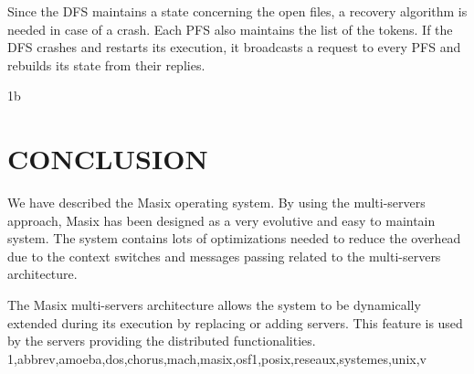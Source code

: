 	Since the DFS maintains a state concerning the open files, a recovery
algorithm is needed in case of a crash. Each PFS also maintains the list of
the tokens. If the DFS crashes and restarts its execution, it broadcasts a
request to every PFS and rebuilds its state from their replies.

%
%
%
 {1b}

\section {CONCLUSION}

	We have described the Masix operating system. By using the
multi-servers approach, Masix has been designed as a very evolutive and easy
to maintain system. The system contains lots of optimizations needed to
reduce the overhead due to the context switches and messages passing related
to the multi-servers architecture.

	The Masix multi-servers architecture allows the system to be
dynamically extended during its execution by replacing or adding servers.
This feature is used by the servers providing the distributed functionalities.
	 {1,abbrev,amoeba,dos,chorus,mach,masix,osf1,posix,reseaux,systemes,unix,v}


